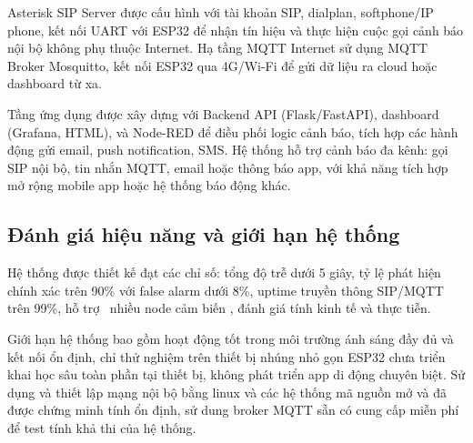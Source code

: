Asterisk SIP Server được cấu hình với tài khoản SIP, dialplan, softphone/IP phone, kết nối UART với ESP32 để nhận tín hiệu và thực hiện cuộc gọi cảnh báo nội bộ không phụ thuộc Internet. Hạ tầng MQTT Internet sử dụng MQTT Broker Mosquitto, kết nối ESP32 qua 4G/Wi-Fi để gửi dữ liệu ra cloud hoặc dashboard từ xa.

Tầng ứng dụng được xây dựng với Backend API (Flask/FastAPI), dashboard (Grafana, HTML), và Node-RED để điều phối logic cảnh báo, tích hợp các hành động gửi email, push notification, SMS. Hệ thống hỗ trợ cảnh báo đa kênh: gọi SIP nội bộ, tin nhắn MQTT, email hoặc thông báo app, với khả năng tích hợp mở rộng mobile app hoặc hệ thống báo động khác.

\subsection{Đánh giá hiệu năng và giới hạn hệ thống}

Hệ thống được thiết kế đạt các chỉ số: tổng độ trễ dưới 5 giây, tỷ lệ phát hiện chính xác trên 90\% với false alarm dưới 8\%, uptime truyền thông SIP/MQTT trên 99\%, hỗ trợ  nhiều node cảm biến , đánh giá tính kinh tế và thực tiễn.

Giới hạn hệ thống bao gồm hoạt động tốt trong môi trường ánh sáng đầy đủ và kết nối ổn định, chỉ thử nghiệm trên thiết bị nhúng nhỏ gọn ESP32 chưa triển khai học sâu toàn phần tại thiết bị, không phát triển app di động chuyên biệt. Sử dụng và thiết lập mạng nội bộ bằng linux và các hệ thống mã nguồn mở và đã được chứng minh tính ổn định, sử dung broker MQTT sẵn có cung cấp miễn phí để test tính khả thi của hệ thống.
